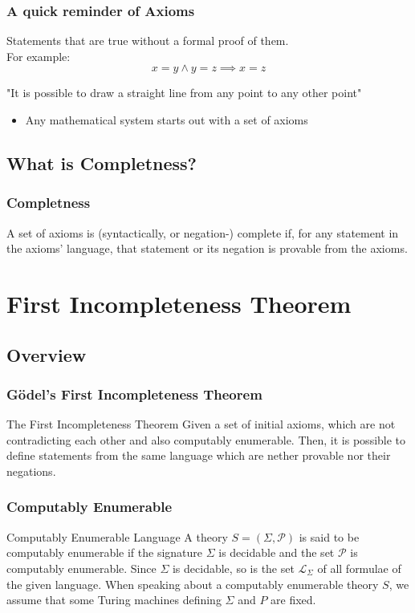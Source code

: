 \documentclass[aspectratio=169]{beamer}
\begin{document}
\begin{frame}
	\frametitle{A quick reminder of Axioms}
	 \begin{Definition}[Axiom]
	 	Statements that are true without a formal proof of them. \\ For example:
	 	\[x = y \land y = z \implies x = z\]
	  	\begin{center}
	  		"It is possible to draw a straight line from any point to any other point"
	  	\end{center}
	 \end{Definition}
	 \begin{itemize}
	 	\item Any mathematical system starts out with a set of axioms
	 \end{itemize}
\end{frame}
\subsection{What is Completness?}
\begin{frame}
	\frametitle{Completness}
	 \begin{Definition}[Complete]
	 	A set of axioms is (syntactically, or negation-) complete if, for any statement in the axioms' language, that statement or its negation is provable from the axioms. \cite{smith}
	 \end{Definition}
\end{frame}
\section{First Incompleteness Theorem}
\subsection{Overview}
\begin{frame}
	\frametitle{Gödel's First Incompleteness Theorem}
	\begin{block}{The First Incompleteness Theorem}
		Given a set of initial axioms, which are not contradicting each other and also computably enumerable. Then, it is possible to define statements from the same language which are nether provable nor their negations.
	\end{block}
\end{frame}

\begin{frame}
	\frametitle{Computably Enumerable}
	\begin{block}{Computably Enumerable Language}
	A theory $S=(\Sigma, \mathscr{P})$ is said to be computably enumerable if the signature $\Sigma$ is decidable and the set $\mathscr{P}$ is computably enumerable. Since $\Sigma$ is decidable, so is the set $\mathscr{L}_{\Sigma}$ of all formulae of the given language. When speaking about a computably enumerable theory $S$, we assume that some Turing machines defining $\Sigma$ and $P$ are fixed. \cite{bekl}
	\end{block}
\end{frame}
\end{document}
